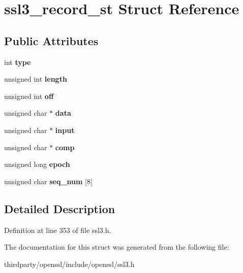\hypertarget{structssl3__record__st}{}\section{ssl3\+\_\+record\+\_\+st Struct Reference}
\label{structssl3__record__st}
\subsection*{Public Attributes}
\begin{DoxyCompactItemize}
\item 
\mbox{\label{structssl3__record__st_a51d0757184a963149122f4c020897002}} 
int {\bfseries type}
\item 
\mbox{\label{structssl3__record__st_ac7ca2fdc9d81e439c02b314c3f6b44e0}} 
unsigned int {\bfseries length}
\item 
\mbox{\label{structssl3__record__st_a6e1645baa9d3a07247d82d15cf54498a}} 
unsigned int {\bfseries off}
\item 
\mbox{\label{structssl3__record__st_af6fe1b3b1e64483b05e1ede9e19607d2}} 
unsigned char $\ast$ {\bfseries data}
\item 
\mbox{\label{structssl3__record__st_aa3a1dee09fd5b0a2732d43cfd81850b8}} 
unsigned char $\ast$ {\bfseries input}
\item 
\mbox{\label{structssl3__record__st_a887d4ab9a66dbea8ff63648d9baa42cb}} 
unsigned char $\ast$ {\bfseries comp}
\item 
\mbox{\label{structssl3__record__st_a52c7ebb11114cf6efca3bbe70a7e0c31}} 
unsigned long {\bfseries epoch}
\item 
\mbox{\label{structssl3__record__st_ab6ec6fd50c32c24851277e3e5f70f38f}} 
unsigned char {\bfseries seq\+\_\+num} \mbox{[}8\mbox{]}
\end{DoxyCompactItemize}


\subsection{Detailed Description}


Definition at line 353 of file ssl3.\+h.



The documentation for this struct was generated from the following file\+:\begin{DoxyCompactItemize}
\item 
thirdparty/openssl/include/openssl/ssl3.\+h\end{DoxyCompactItemize}
